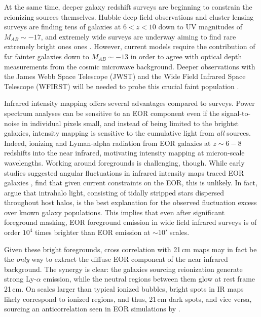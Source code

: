 \documentclass[preprint]{aastex}
\begin{document}
At the same time, deeper galaxy redshift surveys are beginning to constrain the reionizing sources themselves. Hubble deep field observations \citep{Bouwens2011,Illingworth2013,Dunlop2013} and cluster lensing surveys are finding tens of galaxies at $6<z<10$ down to UV magnitudes of $M_{AB}\sim-17$, and extremely wide surveys are underway aiming to find rare extremely bright ones ones \citep{Schmidt2014,Trenti2011,Bradley2012}. However, current models require the contribution of far fainter galaxies down to $M_{AB}\sim-13$ \citep{Robertson2013,Alvarez2012} in order to agree with optical depth measurements \citep{planck16} from the cosmic microwave background. Deeper observations with the James Webb Space Telescope (JWST) \citep{Gardner2006} and the Wide Field Infrared Space Telescope (WFIRST) \citep{Spergel2013} will be needed to probe this crucial faint population \citep{Atek2015}.

Infrared intensity mapping offers several advantages compared to surveys. Power spectrum analyses can be sensitive to an EOR component even if the signal-to-noise in individual pixels small, and instead of being limited to the brightst galaxies, intensity mapping is sensitive to the cumulative light from \textit{all} sources. Indeed,  ionizing and Lyman-alpha radiation from EOR galaxies at $z\sim6-8$ redshifts into the near infrared, motivating intensity mapping at micron-scale wavelengths. Working around foregrounds is challenging, though. While early studies suggested angular fluctuations in infrared intensity maps traced EOR galaxies \citep[e.g.,][]{kash1,kash2,kash3}, \citet{kash4} find that given current constraints on the EOR, this is unlikely. In fact, \citet{cooray12,zemcov14} argue that intrahalo light, consisting of tidally stripped stars dispersed throughout host halos, is the best explanation for the observed fluctuation excess over known galaxy populations. This implies that even after significant foreground masking, EOR foreground emission in wide field infrared surveys is of order $10^4$ times brighter than EOR emission at $\sim10'$ scales.

Given these bright foregrounds, cross correlation with 21\,cm maps may in fact be the \textit{only} way to extract the diffuse EOR component of the near infrared background. The synergy is clear: the galaxies sourcing reionization generate strong Ly-$\alpha$ emission, while the neutral regions between them glow at rest frame 21\,cm. On scales larger than typical ionized bubbles, bright spots in IR maps likely correspond to ionized regions, and thus, 21\,cm dark spots, and vice versa, sourcing an anticorrelation seen in EOR simulations by \citet{StarsAndReionization,silva12,mao14,heneka16}. 
\end{document}
